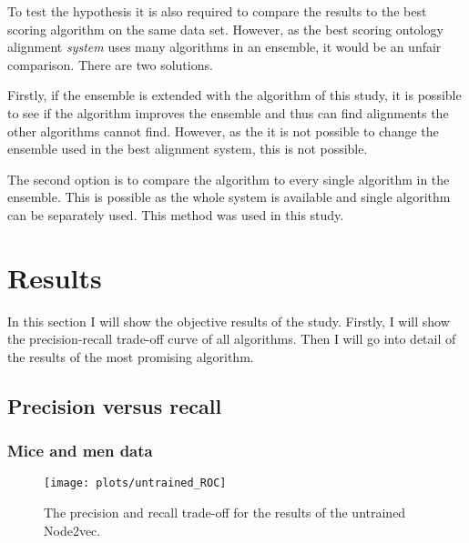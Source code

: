 \documentclass{article}
\begin{document}
 To test the hypothesis it is also required to compare the results to the best scoring algorithm on the same data set. However, as the best scoring ontology alignment \textit{system} uses many algorithms in an ensemble, it would be an unfair comparison. There are two solutions. 
 
 Firstly, if the ensemble is extended with the algorithm of this study, it is possible to see if the algorithm improves the ensemble and thus can find alignments the other algorithms cannot find.
 However, as the it is not possible to change the ensemble used in the best alignment system, this is not possible.
 
 The second option is to compare the algorithm to every single algorithm in the ensemble. This is possible as the whole system is available and single algorithm can be separately used. This method was used in this study.
 
 \newpage
 \section{Results} \label{results}
 
 In this section I will show the objective results of the study. Firstly, I will show the precision-recall trade-off curve of all algorithms. Then I will go into detail of the results of the most promising algorithm.
 
 \subsection{Precision versus recall}
  \subsubsection{Mice and men data}
  \begin{figure}[H]
   \centering
   \texttt{[image: plots/untrained\_ROC]}
   \caption[Precision-recall curve untrained mice]{The precision and recall trade-off for the results of the untrained Node2vec.}
   \label{ROC_untrained}
  \end{figure}
 
\end{document}
